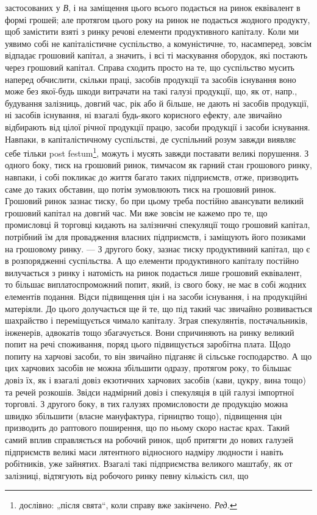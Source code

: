 \parcont{}  %
застосованих у \emph{В}, і на заміщення цього всього подається на ринок еквівалент
в формі грошей; але протягом цього року на ринок не подається
жодного продукту, щоб замістити взяті з ринку речові елементи продуктивного
капіталу. Коли ми уявимо собі не капіталістичне суспільство,
а комуністичне, то, насамперед, зовсім відпадає грошовий капітал, а значить,
і всі ті маскування оборудок, які постають через грошовий капітал.
Справа сходить просто на те, що суспільство мусить наперед обчислити,
скільки праці, засобів продукції та засобів існування воно може без якої-будь
шкоди витрачати на такі галузі продукції, що, як от, напр., будування
залізниць, довгий час, рік або й більше, не дають ні засобів
продукції, ні засобів існування, ні взагалі будь-якого корисного ефекту,
але звичайно відбирають від цілої річної продукції працю, засоби продукції
і засоби існування. Навпаки, в капіталістичному суспільстві, де
суспільний розум завжди виявляє себе тільки post festum\footnote*{
дослівно: „після свята“, коли справу вже закінчено. \emph{Ред.}
}, можуть і мусять
завжди поставати великі порушення. З одного боку, тиск на грошовий
ринок, тимчасом як гарний стан грошового ринку, навпаки, і собі покликає
до життя багато таких підприємств, отже, призводить саме до таких обставин,
що потім зумовлюють тиск на грошовий ринок. Грошовий ринок
зазнає тиску, бо при цьому треба постійно авансувати великий грошовий
капітал на довгий час. Ми вже зовсім не кажемо про те, що промисловці
й торговці кидають на залізничні спекуляції тощо грошовий капітал,
потрібний їм для провадження власних підприємств, і заміщують його позиками
на грошовому ринку. — З другого боку, зазнає тиску продуктивний капітал,
що є в розпорядженні суспільства. А що елементи продуктивного капіталу
постійно вилучається з ринку і натомість на ринок подається лише
грошовий еквівалент, то більшає виплатоспроможний попит, який, із свого
боку, не має в собі жодних елементів подання. Відси підвищення цін
і на засоби існування, і на продукційні матеріяли. До цього долучається
ще й те, що під такий час звичайно розвивається шахрайство і переміщується
чимало капіталу. Зграя спекулянтів, постачальників, інженерів,
адвокатів тощо збагачується. Вони спричиняють на ринку великий попит
на речі споживання, поряд цього підвищується заробітна плата. Щодо
попиту на харчові засоби, то він звичайно підганяє й сільське господарство.
А що цих харчових засобів не можна збільшити одразу, протягом
року, то більшає довіз їх, як і взагалі довіз екзотичних харчових
засобів (кави, цукру, вина тощо) та речей розкошів. Звідси надмірний
довіз і спекуляція в цій галузі імпортної торговлі. З другого боку, в
тих галузях промисловости де продукцію можна швидко збільшити (власне
мануфактура, гірництво тощо), підвищення цін призводить до раптового
поширення, що по ньому скоро настає крах. Такий самий вплив
справляється на робочий ринок, щоб притягти до нових галузей підприємств
великі маси лятентного відносного надміру людности і навіть робітників,
уже зайнятих. Взагалі такі підприємства великого маштабу, як
от залізниці, відтягують від робочого ринку певну кількість сил, що
\parbreak{}  %
